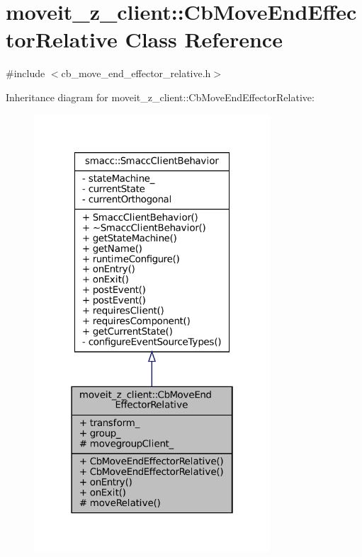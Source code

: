 \hypertarget{classmoveit__z__client_1_1CbMoveEndEffectorRelative}{}\section{moveit\+\_\+z\+\_\+client\+:\+:Cb\+Move\+End\+Effector\+Relative Class Reference}
\label{classmoveit__z__client_1_1CbMoveEndEffectorRelative}


{\ttfamily \#include $<$cb\+\_\+move\+\_\+end\+\_\+effector\+\_\+relative.\+h$>$}



Inheritance diagram for moveit\+\_\+z\+\_\+client\+:\+:Cb\+Move\+End\+Effector\+Relative\+:
\nopagebreak
\begin{figure}[H]
\begin{center}
\leavevmode
\includegraphics[width=250pt]{classmoveit__z__client_1_1CbMoveEndEffectorRelative__inherit__graph}
\end{center}
\end{figure}


